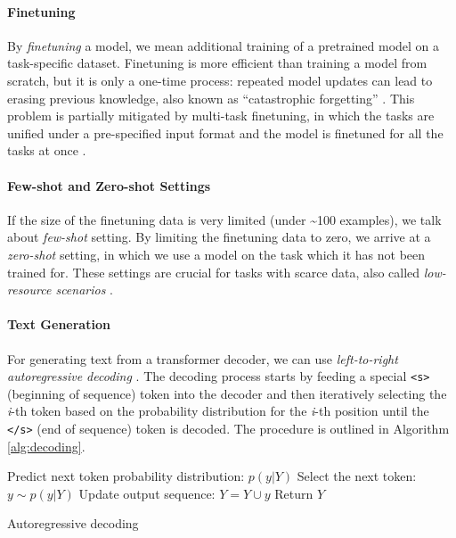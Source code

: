 {\paragraph{Finetuning} By \emph{finetuning} a model, we mean additional training of a pretrained model on a task-specific dataset. Finetuning is more efficient than training a model from scratch, but it is only a one-time process: repeated model updates can lead to erasing previous knowledge, also known as ``catastrophic forgetting'' \cite{mccloskey1989catastrophic,kirkpatrick2017overcoming}. This problem is partially mitigated by multi-task finetuning, in which the tasks are unified under a pre-specified input format and the model is finetuned for all the tasks at once \cite{sanh2021multitask,xieUnifiedSKGUnifyingMultiTasking2022}.


\paragraph{Few-shot and Zero-shot Settings} If the size of the finetuning data is very limited (under \textasciitilde 100 examples), we talk about \emph{few-shot} setting. By limiting the finetuning data to zero, we arrive at a \emph{zero-shot} setting, in which we use a model on the task which it has not been trained for. These settings are crucial for tasks with scarce data, also called \emph{low-resource scenarios} \cite{hedderich2021survey}.

\paragraph{Text Generation} For generating text from a transformer decoder, we can use \textit{left-to-right autoregressive decoding} \cite[p.196]{jurafsky2024}. The decoding process starts by feeding a special \texttt{<s>} (beginning of sequence) token into the decoder and then iteratively selecting the \emph{i}-th token based on the probability distribution for the \emph{i}-th position until the  \texttt{</s>} (end of sequence) token is decoded. The procedure is outlined in Algorithm \ref{alg:decoding}.
\begin{algorithm}[ht]
    \begin{algorithmic}[1]
        \State Predict next token probability distribution: $p(y | Y)$
        \State Select the next token: $y \sim p(y | Y)$ \label{alg:dec:sample}
        \State Update output sequence: $Y = Y \cup y$
        \EndWhile
        \State Return $Y$
    \end{algorithmic}
    \caption{Autoregressive decoding}
    \label{alg:decoding}
\end{algorithm}

}
